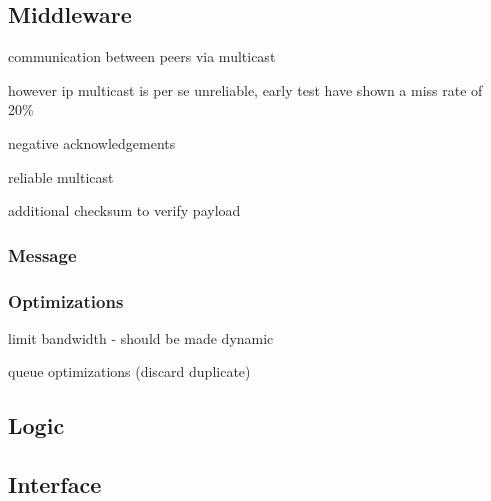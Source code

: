 


\subsection{Middleware}
communication between peers via multicast 

however ip multicast is per se unreliable, early test have shown a miss rate of 20\%

negative acknowledgements

reliable multicast

additional checksum to verify payload

\subsubsection{Message}




\subsubsection{Optimizations}

limit bandwidth 
    - should be made dynamic
    
queue optimizations (discard duplicate)

\subsection{Logic}


\subsection{Interface}